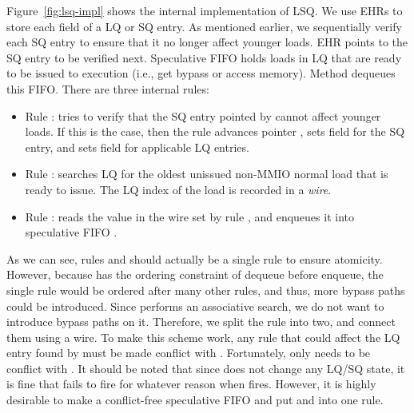 Figure~\ref{fig:lsq-impl} shows the internal implementation of LSQ.
We use EHRs to store each field of a LQ or SQ entry.
As mentioned earlier, we sequentially verify each SQ entry to ensure that it no longer affect younger loads.
EHR  points to the SQ entry to be verified next.
Speculative FIFO  holds loads in LQ that are ready to be issued to execution (i.e., get bypass or access memory).
Method  dequeues this FIFO.
There are three internal rules:
\begin{itemize}
    \item Rule : tries to verify that the SQ entry pointed by  cannot affect younger loads.
    If this is the case, then the rule advances pointer , sets field  for the SQ entry, and sets field  for applicable LQ entries.
    \item Rule : searches LQ for the oldest unissued non-MMIO normal load that is ready to issue.
    The LQ index of the load is recorded in a \emph{wire}.
    \item Rule : reads the value in the wire set by rule , and enqueues it into speculative FIFO .
\end{itemize}
As we can see, rules  and  should actually be a single rule to ensure atomicity.
However, because  has the ordering constraint of dequeue before enqueue, the single rule would be ordered after many other rules, and thus, more bypass paths could be introduced.
Since  performs an associative search, we do not want to introduce bypass paths on it.
Therefore, we split the rule into two, and connect them using a wire.
To make this scheme work, any rule that could affect the LQ entry found by  must be made conflict with .
Fortunately, only  needs to be conflict with .
It should be noted that since  does not change any LQ/SQ state, it is fine that  fails to fire for whatever reason when  fires.
However, it is highly desirable to make  a conflict-free speculative FIFO and put  and  into one rule.

